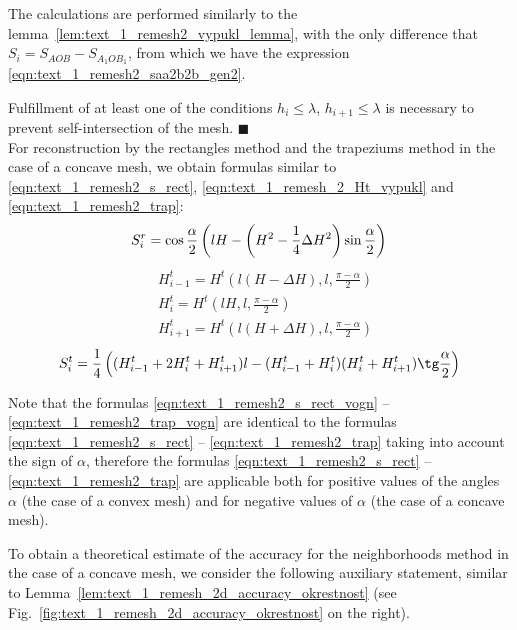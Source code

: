 \documentclass[
11pt,%
tightenlines,%
twoside,%
onecolumn,%
nofloats,%
nobibnotes,%
nofootinbib,%
superscriptaddress,%
noshowpacs,%
centertags]%
{revtex4}
\begin{document}
The calculations are performed similarly to the lemma~\ref{lem:text_1_remesh2_vypukl_lemma}, with the only difference that $S_i = S_{AOB} - S_{A_1OB_1}$, from which we have the expression \eqref{eqn:text_1_remesh2_saa2b2b_gen2}.

Fulfillment of at least one of the conditions $h_i \le \lambda$, $h_{i+1} \le \lambda$ is necessary to prevent self-intersection of the mesh.
$\blacksquare$\\

For reconstruction by the rectangles method and the trapeziums method in the case of a concave mesh, we obtain formulas similar to \eqref{eqn:text_1_remesh2_s_rect}, \eqref{eqn:text_1_remesh_2_Ht_vypukl} and \eqref{eqn:text_1_remesh2_trap}:
\begin{equation}\label{eqn:text_1_remesh2_s_rect_vogn}
	S_i^r = \cos \frac{\alpha}{2} \left( lH - \left( H^2 - \frac{1}{4} \Delta H^2 \right) \sin \frac{\alpha}{2} \right) \\
\end{equation}
\begin{equation}\label{eqn:text_1_remesh_2_Ht_vogn}
	\begin{aligned}
	& H_{i - 1}^t = H^t\left(l(H - \Delta H), l, \frac{\pi - \alpha}{2}\right) \\ 
	& H_i^t = H^t\left(lH, l, \frac{\pi - \alpha}{2}\right) \\
	& H_{i + 1}^t = H^t\left(l(H + \Delta H), l, \frac{\pi - \alpha}{2}\right)
	\end{aligned}
\end{equation}
\begin{equation}\label{eqn:text_1_remesh2_trap_vogn}
	S_i^t = \frac{1}{4} \left( (H_{i - 1}^t + 2 H_i^t + H_{i + 1}^t)l - (H_{i - 1}^t + H_i^t) (H_i^t + H_{i+1}^t) \tg \frac{\alpha}{2} \right)
\end{equation}

Note that the formulas \eqref{eqn:text_1_remesh2_s_rect_vogn} -- \eqref{eqn:text_1_remesh2_trap_vogn} are identical to the formulas \eqref{eqn:text_1_remesh2_s_rect} -- \eqref{eqn:text_1_remesh2_trap} taking into account the sign of $\alpha$, therefore the formulas \eqref{eqn:text_1_remesh2_s_rect} -- \eqref{eqn:text_1_remesh2_trap} are applicable both for positive values of the angles $\alpha$ (the case of a convex mesh) and for negative values of $\alpha$ (the case of a concave mesh).

To obtain a theoretical estimate of the accuracy for the neighborhoods method in the case of a concave mesh, we consider the following auxiliary statement, similar to Lemma~\ref{lem:text_1_remesh_2d_accuracy_okrestnost} (see Fig.~\ref{fig:text_1_remesh_2d_accuracy_okrestnost} on the right).
\end{document}

